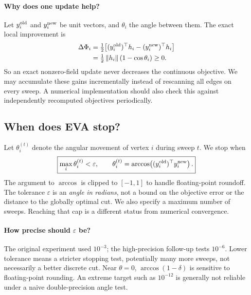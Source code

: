 \documentclass[10pt,letterpaper]{article}
\newcommand{\norm}[1]{\left\lVert#1\right\rVert}
\begin{document}
\paragraph{Why does one update help?} Let $y_i^{\rm old}$ and $y_i^{\rm new}$ be unit vectors, and $\theta_i$ the angle between them. The exact local improvement is
\begin{equation}\label{eq:gain}
 \begin{aligned}
 \Delta\Phi_i
 &=\tfrac12\bigl[(y_i^{\rm old})^\top h_i
      -(y_i^{\rm new})^\top h_i\bigr]\\
 &=\tfrac12\norm{h_i}(1-\cos\theta_i)\ge0.
 \end{aligned}
\end{equation}
So an exact nonzero-field update never decreases the continuous objective. We may accumulate these gains incrementally instead of rescanning all edges on every sweep. A numerical implementation should also check this against independently recomputed objectives periodically.

\subsection{When does EVA stop?}
Let $\theta_i^{(t)}$ denote the angular movement of vertex $i$ during sweep $t$. We stop when
\begin{equation}\label{eq:stop}
 \boxed{\max_i\theta_i^{(t)}<\varepsilon,\qquad
 \theta_i^{(t)}=\arccos\!\left(
 (y_i^{\rm old})^\top y_i^{\rm new}\right).}
\end{equation}
The argument to $\arccos$ is clipped to $[-1,1]$ to handle floating-point roundoff. The tolerance $\varepsilon$ is an \emph{angle in radians}, not a bound on the objective error or the distance to the globally optimal cut. We also specify a maximum number of sweeps. Reaching that cap is a different status from numerical convergence.

\paragraph{How precise should $\varepsilon$ be?} The original experiment used $10^{-3}$; the high-precision follow-up tests $10^{-6}$. Lower tolerance means a stricter stopping test, potentially many more sweeps, not necessarily a better discrete cut. Near $\theta=0$, $\arccos(1-\delta)$ is sensitive to floating-point rounding. An extreme target such as $10^{-12}$ is generally not reliable under a naive double-precision angle test.
\end{document}
